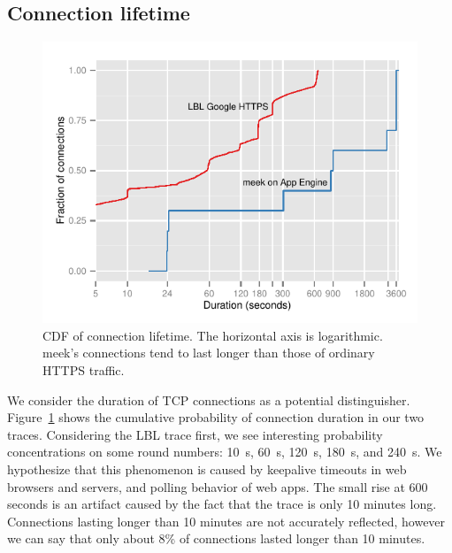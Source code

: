 \documentclass[conference]{IEEEtran}
\begin{document}
\subsection{Connection lifetime}

\begin{figure}
\centering
\includegraphics[width=\linewidth]{flowduration}
\caption{
CDF of connection lifetime.
The horizontal axis is logarithmic.
meek's connections tend to last longer than those of ordinary HTTPS traffic.
}
\label{fig:duration}
\end{figure}


We consider the duration of TCP connections as a potential distinguisher.
Figure~\ref{fig:duration} shows the cumulative probability
of connection duration in our two traces.
Considering the LBL trace first,
we see interesting probability concentrations on
some round numbers: 10~s, 60~s, 120~s, 180~s, and 240~s.
We hypothesize that this phenomenon is caused by
keepalive timeouts in web browsers and servers,
and polling behavior of web apps.
The small rise at 600 seconds is an artifact caused
by the fact that the trace is only 10 minutes long.
Connections lasting longer than 10 minutes are not accurately reflected,
however we can say that only about 8\% of connections lasted longer than 10 minutes.
\end{document}
